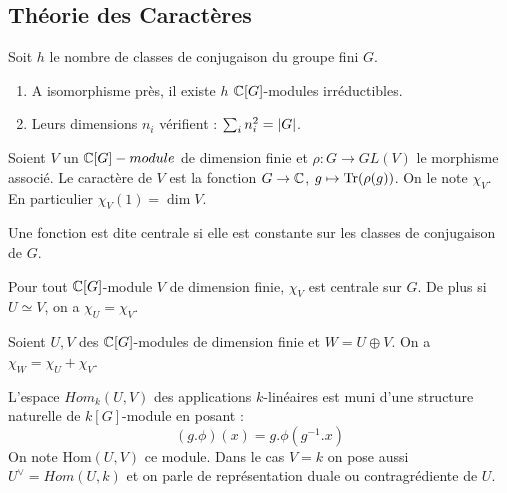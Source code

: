 \documentclass{cours}
\begin{document}
\subsection{Théorie des Caractères}
\begin{theorem}
    Soit $h$ le nombre de classes de conjugaison du groupe fini $G$.
    \begin{enumerate}
        \item A isomorphisme près, il existe $h$ $\mathbb{C}[G]$-modules irréductibles.
        \item Leurs dimensions $n_{i}$ vérifient : $\sum_{i} n_{i}^{2} = \left|G\right|$.
    \end{enumerate}
\end{theorem}

\begin{definition}
    Soient $V$ un $\mathbb{C}[G]-module$ de dimension finie et $\rho : G \rightarrow GL(V)$ le morphisme associé. Le caractère de $V$ est la fonction $G \to \mathbb{C}$, $g \mapsto \operatorname{Tr}(\rho(g))$. On le note $\chi_{V}$. En particulier $\chi_{V}(1) = \dim V$.
\end{definition}

\begin{definition}
    Une fonction est dite centrale si elle est constante sur les classes de conjugaison de $G$.
\end{definition}

\begin{proposition}
    Pour tout $\mathbb{C}[G]$-module $V$ de dimension finie, $\chi_{V}$ est centrale sur $G$. De plus si $U \simeq V$, on a $\chi_{U} = \chi_{V}$.
\end{proposition}

\begin{proposition}
    Soient $U, V$ des $\mathbb{C}[G]$-modules de dimension finie et $W = U \oplus V$. On a $\chi_{W} = \chi_{U} + \chi_{V}$.
\end{proposition}

\begin{definition}
    L'espace $Hom_{k}(U, V)$ des applications $k$-linéaires est muni d'une structure naturelle de $k[G]$-module en posant :
    \[
        \left(g.\phi\right)(x) = g.\phi(g^{-1}.x)
    \]
    On note Hom$(U, V)$ ce module. Dans le cas $V = k$ on pose aussi $U^{\lor} = Hom(U, k)$ et on parle de représentation duale ou contragrédiente de $U$.
\end{definition}
\end{document}
